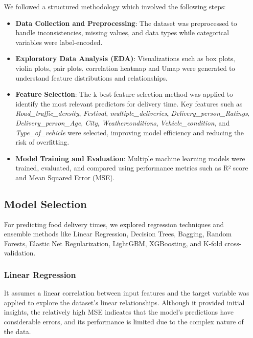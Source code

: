 \documentclass[10pt,twocolumn,letterpaper]{article}
\begin{document}
    We followed a structured methodology which involved the following steps:
    \begin{itemize}
        \item \textbf{Data Collection and Preprocessing}: The dataset was preprocessed to handle inconsistencies, missing values, and data types while categorical variables were label-encoded.
        
        \item \textbf{Exploratory Data Analysis (EDA)}: Visualizations such as box plots, violin plots, pair plots, correlation heatmap and Umap were generated to understand feature distributions and relationships.
        
        \item \textbf{Feature Selection}: The k-best feature selection method was applied to identify the most relevant predictors for delivery time. Key features such as \textit{Road\_traffic\_density}, \textit{Festival}, \textit{multiple\_deliveries}, \textit{Delivery\_person\_Ratings}, \textit{Delivery\_person\_Age}, \textit{City}, \textit{Weatherconditions}, \textit{Vehicle\_condition}, and \textit{Type\_of\_vehicle} were selected, improving model efficiency and reducing the risk of overfitting.
        \item \textbf{Model Training and Evaluation}: Multiple machine learning models were trained, evaluated, and compared using performance metrics such as R² score and Mean Squared Error (MSE).
    
    \end{itemize}
    
    \subsection{Model Selection}
        For predicting food delivery times, we explored regression techniques and ensemble methods like Linear Regression, Decision Trees, Bagging, Random Forests, Elastic Net Regularization, LightGBM, XGBoosting, and K-fold cross-validation.

        \subsubsection{Linear Regression}
            It assumes a linear correlation between input features and the target variable was applied to explore the dataset’s linear relationships. Although it provided initial insights, the relatively high MSE indicates that the model's predictions have considerable errors, and its performance is limited due to the complex nature of the data.
\end{document}
